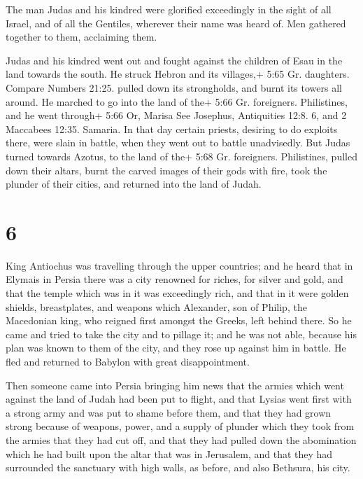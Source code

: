  The man Judas and his kindred were glorified exceedingly
in the sight of all Israel, and of all the Gentiles, wherever their name
was heard of.  Men gathered together to them, acclaiming
them.

 Judas and his kindred went out and fought against the
children of Esau in the land towards the south. He struck Hebron and its
villages,+ 5:65 Gr. daughters. Compare Numbers 21:25. pulled down its
strongholds, and burnt its towers all around.  He marched
to go into the land of the+ 5:66 Gr. foreigners. Philistines, and he
went through+ 5:66 Or, Marisa See Josephus, Antiquities 12:8. 6, and 2
Maccabees 12:35. Samaria.  In that day certain priests,
desiring to do exploits there, were slain in battle, when they went out
to battle unadvisedly.  But Judas turned towards Azotus, to
the land of the+ 5:68 Gr. foreigners. Philistines, pulled down their
altars, burnt the carved images of their gods with fire, took the
plunder of their cities, and returned into the land of Judah.

\hypertarget{section-5}{%
\section{6}\label{section-5}}

 King Antiochus was travelling through the upper countries;
and he heard that in Elymais in Persia there was a city renowned for
riches, for silver and gold,  and that the temple which was
in it was exceedingly rich, and that in it were golden shields,
breastplates, and weapons which Alexander, son of Philip, the Macedonian
king, who reigned first amongst the Greeks, left behind there.
 So he came and tried to take the city and to pillage it;
and he was not able, because his plan was known to them of the city,
 and they rose up against him in battle. He fled and
returned to Babylon with great disappointment.

 Then someone came into Persia bringing him news that the
armies which went against the land of Judah had been put to flight,
 and that Lysias went first with a strong army and was put
to shame before them, and that they had grown strong because of weapons,
power, and a supply of plunder which they took from the armies that they
had cut off,  and that they had pulled down the abomination
which he had built upon the altar that was in Jerusalem, and that they
had surrounded the sanctuary with high walls, as before, and also
Bethsura, his city.

